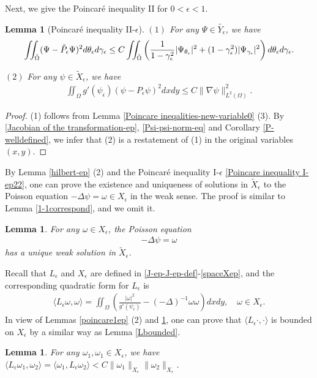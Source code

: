 \documentclass[1 [leqno, 11pt]{amsart}
\numberwithin{equation}{section}
\let\ep=\epsilon
\newtheorem{lemma}[Theorem]{Lemma}
\begin{document}
\begin{CJK*}{GBK}{song}
Next,  we give the Poincar\'e inequality II for $0<\epsilon<1$.
\begin{lemma}[Poincar\'e inequality II-$\ep$]\label{poincare2ep}
$(1)$ For any $\Psi \in \tilde{Y_\ep}$,
we have
\begin{align*}
\iint_{\tilde \Omega} (\Psi -\tilde P_\epsilon\Psi)^2 d \theta_\ep d\gamma_\ep  \leq C \iint_{\tilde \Omega}\left({1\over1-\gamma_\ep^2}|\Psi_{\theta_\ep}|^2+(1-\gamma_\ep^2)|\Psi_{\gamma_\ep}|^2\right)d \theta_\ep d\gamma_\ep.
\end{align*}

$(2)$ For any $\psi \in \tilde{X}_\ep$,
we have
\begin{align}\label{Poincare inequality II-ep22}
\iint_\Omega g'(\psi_\epsilon)(\psi - P_\epsilon\psi)^2 dxdy  \leq C \|\nabla \psi\|_{L^2(\Omega)}^2.
\end{align}


\end{lemma}
\begin{proof}
(1)  follows from Lemma \ref{Poincare ineqalities-new-variable0} (3). By \eqref{Jacobian of the transformation-ep}, \eqref{Psi-psi-norm-eq} and Corollary \ref{P-welldefined},  we infer that   (2) is a restatement of  (1) in the original variables $(x,y)$.
\end{proof}
By Lemma \ref{hilbert-ep} (2) and  the Poincar\'e inequality I-$\ep$ \eqref{Poincare inequality I-ep22}, one can prove the existence and uniqueness of solutions in $\tilde X_\ep$ to the Poisson equation $-\Delta \psi = \omega\in X_\ep$ in the weak sense. The proof is similar to
Lemma  \ref{1-1correspond}, and we omit it.

\begin{lemma}\label{1-1correspond-ep}
For any $\omega \in X_\ep$, the Poisson equation
\begin{align*}
-\Delta \psi = \omega
\end{align*}
has a unique weak solution in $\tilde{X}_\ep$.
\end{lemma}
Recall that  $L_\ep$ and $X_\epsilon$ are defined in \eqref{J-ep-J-ep-def}-\eqref{spaceXep}, and the corresponding quadratic form for $L_\ep$ is
\begin{align*}
 \langle L_\epsilon\omega,\omega\rangle=\iint_\Omega\left(\frac {|\omega|^2} {g'(\psi_\epsilon)} - (-\Delta)^{-1}\omega\omega \right) dxdy,\quad\omega\in X_\epsilon.
\end{align*}
In view of Lemmas \ref{poincare1ep} (2) and \ref{1-1correspond-ep}, one can prove that $\langle L_\epsilon\cdot,\cdot\rangle$ is bounded on $ X_\epsilon$ by a similar way as Lemma \ref{Lbounded}.
\begin{lemma}\label{Lbounded-ep}
For any $\omega_1,\omega_1 \in X_\ep$, we have
$\langle L_\ep \omega_1, \omega_2 \rangle=\langle  \omega_1, L_\ep\omega_2 \rangle < C\|\omega_1\|_{X_\epsilon}\|\omega_2\|_{X_\epsilon}$.
\end{lemma}

\end{CJK*}
\end{document}
